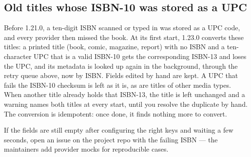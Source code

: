 \subsection*{Old titles whose ISBN-10 was stored as a UPC}

Before 1.21.0, a ten-digit ISBN scanned or typed in was stored as a
UPC code, and every provider then missed the book. At its first
start, 1.23.0 converts these titles: a printed title (book, comic,
magazine, report) with no ISBN and a ten-character UPC that is a
valid ISBN-10 gets the corresponding ISBN-13 and loses the UPC, and
its metadata is looked up again in the background, through the retry
queue above, now by ISBN. Fields edited by hand are kept. A UPC that
fails the ISBN-10 checksum is left as it is, as are titles of other
media types. When another title already holds that ISBN-13, the title
is left unchanged and a warning names both titles at every start, until
you resolve the duplicate by hand. The conversion is idempotent: once
done, it finds nothing more to convert.

If the fields are still empty after configuring the right keys
and waiting a few seconds, open an issue on the project repo with
the failing ISBN — the maintainers add provider mocks for
reproducible cases.
